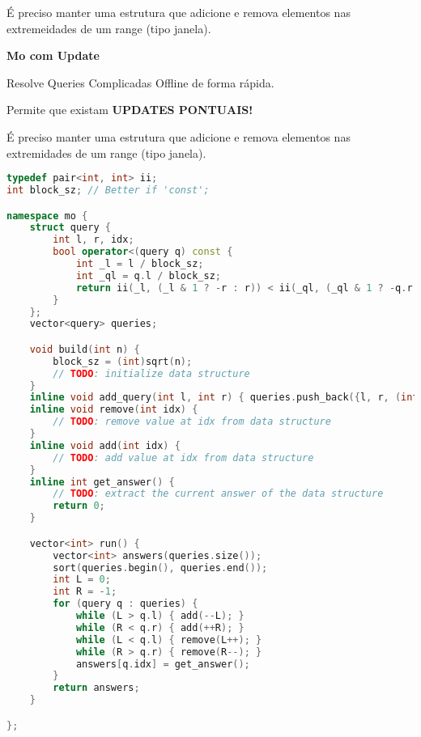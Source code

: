 \documentclass[11pt, a4paper, twoside]{book}
\begin{document}
É preciso manter uma estrutura que adicione e remova elementos nas extremeidades de um range (tipo janela).





\textbf{Mo com Update} 



Resolve Queries Complicadas Offline de forma rápida.   

Permite que existam \textbf{UPDATES PONTUAIS!}  

É preciso manter uma estrutura que adicione e remova elementos nas extremidades de um range (tipo janela).




\hfill

\begin{lstlisting}[language=C++]
typedef pair<int, int> ii;
int block_sz; // Better if 'const';

namespace mo {
    struct query {
        int l, r, idx;
        bool operator<(query q) const {
            int _l = l / block_sz;
            int _ql = q.l / block_sz;
            return ii(_l, (_l & 1 ? -r : r)) < ii(_ql, (_ql & 1 ? -q.r : q.r));
        }
    };
    vector<query> queries;

    void build(int n) {
        block_sz = (int)sqrt(n);
        // TODO: initialize data structure
    }
    inline void add_query(int l, int r) { queries.push_back({l, r, (int)queries.size()}); }
    inline void remove(int idx) {
        // TODO: remove value at idx from data structure
    }
    inline void add(int idx) {
        // TODO: add value at idx from data structure
    }
    inline int get_answer() {
        // TODO: extract the current answer of the data structure
        return 0;
    }

    vector<int> run() {
        vector<int> answers(queries.size());
        sort(queries.begin(), queries.end());
        int L = 0;
        int R = -1;
        for (query q : queries) {
            while (L > q.l) { add(--L); }
            while (R < q.r) { add(++R); }
            while (L < q.l) { remove(L++); }
            while (R > q.r) { remove(R--); }
            answers[q.idx] = get_answer();
        }
        return answers;
    }

};
\end{lstlisting}

\hfill
\end{document}
